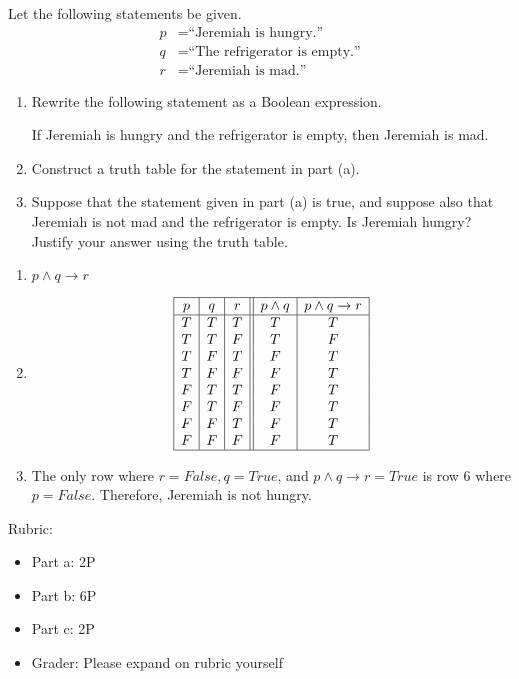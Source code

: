 \documentclass{article}
\theoremstyle{definition}
\begin{document}
\begin{question}
	Let the following statements be given.
		\begin{align*}
		p &= \text{``Jeremiah is hungry.''}\\
		q &= \text{``The refrigerator is empty.''}\\
		r &= \text{``Jeremiah is mad.''}
		\end{align*}
	\begin{enumerate}
		\item Rewrite the following statement as a Boolean expression.\\
			\begin{center}
			If Jeremiah is hungry and the refrigerator is empty, then Jeremiah is mad.
			\end{center}
		\item Construct a truth table for the statement in part (a).
		\item Suppose that the statement given in part (a) is true, and suppose also that Jeremiah is not mad and the refrigerator is empty. Is Jeremiah hungry? Justify your answer using the truth table.
	\end{enumerate}
\end{question}
\begin{solution}
	\begin{enumerate}
	\item $p\wedge q \to r$
	\item 
	\[\begin{array}{| c | c | c || c | c |}
	\hline
	p & q & r & p \wedge q & p \wedge q \to r\\
	\hline
		T & T & T & T & T\\
		T & T & F & T & F\\
		T & F & T & F & T\\
		T & F & F & F & T\\
		F & T & T & F & T\\
		F & T & F & F & T\\
		F & F & T & F & T\\
		F & F & F & F & T\\
	\hline
	\end{array}\]
	\item The only row where $r=False, q=True$, and $p \wedge q \to r=True$ is row 6 where $p=False$. Therefore, Jeremiah is not hungry.
	\end{enumerate}
{\color{red} Rubric:
\begin{itemize}
\item Part a: 2P
\item Part b: 6P
\item Part c: 2P 
\item Grader: Please expand on rubric yourself
\end{itemize}}
\end{solution}
\end{document}
